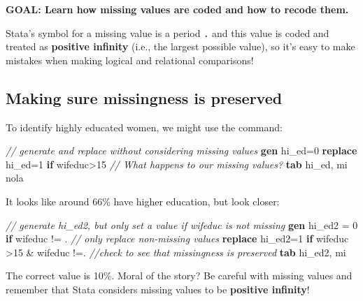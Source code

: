 \documentclass[
]{book}
\newenvironment{Shaded}{\begin{snugshade}}{\end{snugshade}}
\newcommand{\CommentTok}[1]{\textcolor[rgb]{0.56,0.35,0.01}{\textit{#1}}}
\newcommand{\FunctionTok}[1]{\textcolor[rgb]{0.00,0.00,0.00}{#1}}
\newcommand{\KeywordTok}[1]{\textcolor[rgb]{0.13,0.29,0.53}{\textbf{#1}}}
\newcommand{\NormalTok}[1]{#1}
\begin{document}
\begin{alert}

\textbf{GOAL: Learn how missing values are coded and how to recode them.}

\end{alert}

Stata's symbol for a missing value is a period \texttt{.} and this value is coded and treated as \textbf{positive infinity} (i.e., the largest possible value), so it's easy to make mistakes when making logical and relational comparisons!

\hypertarget{making-sure-missingness-is-preserved}{%
\subsection{Making sure missingness is preserved}\label{making-sure-missingness-is-preserved}}

To identify highly educated women, we might use the command:

\begin{Shaded}
\begin{Highlighting}[]
\CommentTok{// generate and replace without considering missing values}
\KeywordTok{gen}\NormalTok{ hi\_ed=0}
\KeywordTok{replace}\NormalTok{ hi\_ed=1 }\KeywordTok{if}\NormalTok{ wifeduc\textgreater{}15}
\CommentTok{// What happens to our missing values?}
\KeywordTok{tab}\NormalTok{ hi\_ed, }\FunctionTok{mi}\NormalTok{ nola}
\end{Highlighting}
\end{Shaded}

It looks like around 66\% have higher education, but look closer:

\begin{Shaded}
\begin{Highlighting}[]
\CommentTok{// generate hi\_ed2, but only set a value if wifeduc is not missing}
\KeywordTok{gen}\NormalTok{ hi\_ed2 = 0 }\KeywordTok{if}\NormalTok{ wifeduc != . }
\CommentTok{// only replace non{-}missing values}
\KeywordTok{replace}\NormalTok{ hi\_ed2=1 }\KeywordTok{if}\NormalTok{ wifeduc \textgreater{}15 \& wifeduc !=. }
\CommentTok{//check to see that missingness is preserved}
\KeywordTok{tab}\NormalTok{ hi\_ed2, }\FunctionTok{mi}
\end{Highlighting}
\end{Shaded}

The correct value is 10\%. Moral of the story? Be careful with missing values and remember that Stata considers missing values to be \textbf{positive infinity}!
\end{document}
